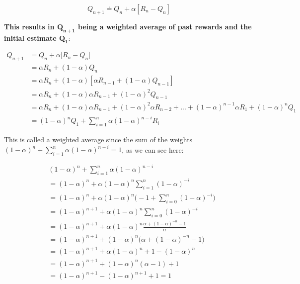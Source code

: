 \begin{equation}
    Q_{n+1} \doteq Q_n + \alpha \left[R_n - Q_n \right]
    \label{eq:ch3-nonstationaryincrementalupdaterule}
\end{equation}

\textbf{This results in $\boldsymbol{Q_{n+1}}$ being a weighted average of past rewards and the initial estimate $\boldsymbol{Q_1}$}:

\begin{equation}
    \begin{split}
        Q_{n+1} &= Q_n + \alpha \Big[ R_n - Q_n \Big] \\
        &= \alpha R_n + (1 - \alpha) Q_n \\
        &= \alpha R_n + (1 - \alpha) [\alpha R_{n-1} + (1 - \alpha) Q_{n-1}] \\
        &= \alpha R_n + (1 - \alpha) \alpha R_{n-1} + (1 - \alpha)^2 Q_{n-1} \\
        &= \alpha R_n + (1 - \alpha) \alpha R_{n-1} + (1 - \alpha)^2 \alpha R_{n-2} + ... + (1 - \alpha)^{n-1} \alpha R_1 + (1 - \alpha)^n Q_1 \\
        &= (1 - \alpha)^n Q_1 + \sum_{i=1}^{n} \alpha (1 - \alpha)^{n-i} R_i
    \end{split}
    \label{eq:ch3-exponentialrecencyweightedaverage}
\end{equation}

This is called a weighted average since the sum of the weights $(1 - \alpha)^n + \sum_{i=1}^{n} \alpha (1 - \alpha)^{n-i} = 1$, as we can see here:

\begin{equation*}
    \begin{split}
        & (1 - \alpha)^n + \sum_{i=1}^{n} \alpha (1 - \alpha)^{n-i} \\
        &= (1 - \alpha)^n + \alpha (1 - \alpha)^n \sum_{i=1}^{n} (1 - \alpha)^{-i} \\
        &= (1 - \alpha)^n + \alpha (1 - \alpha)^n \Big(-1 + \sum_{i=0}^{n} (1 - \alpha)^{-i} \Big) \\
        &= (1 - \alpha)^{n+1} + \alpha (1 - \alpha)^n \sum_{i=0}^{n} (1 - \alpha)^{-i} \\
        &= (1 - \alpha)^{n+1} + \alpha (1 - \alpha)^n \frac{\alpha + (1 - \alpha)^{-n} -1}{\alpha} \\
        &= (1 - \alpha)^{n+1} + (1 - \alpha)^n \Big( \alpha + (1 - \alpha)^{-n} -1 \Big) \\
        &= (1 - \alpha)^{n+1} + \alpha (1 - \alpha)^n + 1 - (1 - \alpha)^n \\
        &= (1 - \alpha)^{n+1} + (1 - \alpha)^n (\alpha - 1) + 1 \\
        &= (1 - \alpha)^{n+1} - (1 - \alpha)^{n+1} + 1 = 1
    \end{split}
\end{equation*}

